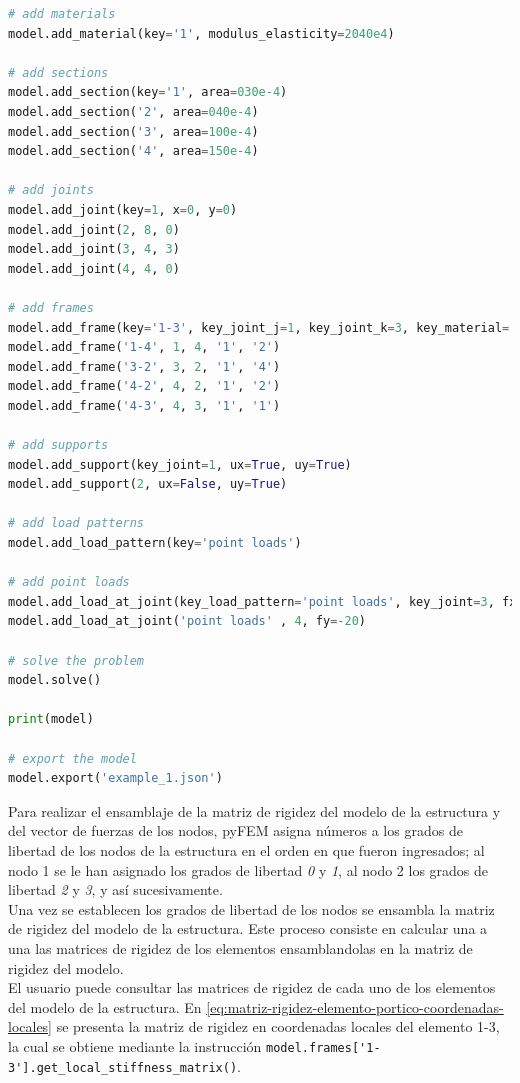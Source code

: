 \begin{ejemplo}
\begin{lstlisting}[language=Python,caption=Ingreso de los datos del modelo de la estructura a \textit{pyFEM}.,label=alg:cercha_plana, frame=single]
# add materials
model.add_material(key='1', modulus_elasticity=2040e4)

# add sections
model.add_section(key='1', area=030e-4)
model.add_section('2', area=040e-4)
model.add_section('3', area=100e-4)
model.add_section('4', area=150e-4)

# add joints
model.add_joint(key=1, x=0, y=0)
model.add_joint(2, 8, 0)
model.add_joint(3, 4, 3)
model.add_joint(4, 4, 0)

# add frames
model.add_frame(key='1-3', key_joint_j=1, key_joint_k=3, key_material='1', key_section='3')
model.add_frame('1-4', 1, 4, '1', '2')
model.add_frame('3-2', 3, 2, '1', '4')
model.add_frame('4-2', 4, 2, '1', '2')
model.add_frame('4-3', 4, 3, '1', '1')

# add supports
model.add_support(key_joint=1, ux=True, uy=True)
model.add_support(2, ux=False, uy=True)

# add load patterns
model.add_load_pattern(key='point loads')

# add point loads
model.add_load_at_joint(key_load_pattern='point loads', key_joint=3, fx=5 * 0.8, fy=5 * 0.6)
model.add_load_at_joint('point loads' , 4, fy=-20)

# solve the problem
model.solve()

print(model)

# export the model
model.export('example_1.json')
  \end{lstlisting}

  Para realizar el ensamblaje de la matriz de rigidez del modelo de la estructura y del vector de fuerzas de los nodos, pyFEM asigna números a los grados de libertad de los nodos de la estructura en el orden en que fueron ingresados; al nodo 1 se le han asignado los grados de libertad \emph{0} y \emph{1}, al nodo 2 los grados de libertad \emph{2} y \emph{3}, y así sucesivamente.\\

  Una vez se establecen los grados de libertad de los nodos se ensambla la matriz de rigidez del modelo de la estructura. Este proceso consiste en calcular una a una las matrices de rigidez de los elementos ensamblandolas en la matriz de rigidez del modelo.\\

  El usuario puede consultar las matrices de rigidez de cada uno de los elementos del modelo de la estructura. En \ref{eq:matriz-rigidez-elemento-portico-coordenadas-locales} se presenta la matriz de rigidez en coordenadas locales del elemento 1-3, la cual se obtiene mediante la instrucción \verb|model.frames['1-3'].get_local_stiffness_matrix()|.\\


\end{ejemplo}
